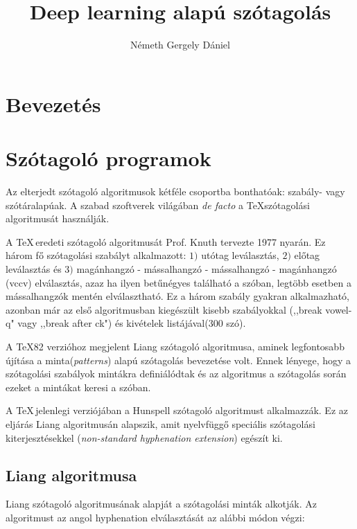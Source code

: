 \documentclass[a4paper, magyar]{article}
\title{Deep learning alapú szótagolás}
\author{N{\'e}meth Gergely D{\'a}niel}
\date{}
\begin{document}
\selectfont
\maketitle



\begin{abstract}

\end{abstract}
\begin{abstract}
	
\end{abstract}

\section{Bevezetés}
\section{Szótagoló programok}
Az elterjedt szótagoló algoritmusok kétféle csoportba bonthatóak: szabály- vagy szótáralapúak. A szabad szoftverek világában \textit{de facto} a \TeX szótagolási algoritmusát használják.

A \TeX\,eredeti szótagoló algoritmusát Prof. Knuth tervezte 1977 nyarán\cite{knuth1979tex}. Ez három fő szótagolási szabályt alkalmazott: $1)$ utótag leválasztás, $2)$ előtag leválasztás és $3)$ magánhangzó - mássalhangzó - mássalhangzó - magánhangzó (vccv) elválasztás, azaz ha ilyen betűnégyes található a szóban, legtöbb esetben a mássalhangzók mentén elválasztható. Ez a három szabály gyakran alkalmazható, azonban már az első algoritmusban kiegészült kisebb szabályokkal (,,break vowel-q" vagy ,,break after ck") és kivételek listájával(300 szó).

A \TeX82 verzióhoz megjelent Liang szótagoló algoritmusa\cite{liang1983word}, aminek legfontosabb újítása a minta(\textit{patterns}) alapú szótagolás bevezetése volt. Ennek lényege, hogy a szótagolási szabályok mintákra definiálódtak és az algoritmus a szótagolás során ezeket a mintákat keresi a szóban.

A \TeX\,jelenlegi verziójában a Hunspell szótagoló algoritmust alkalmazzák\cite{nemeth2006automatic}. Ez az eljárás Liang algoritmusán alapszik, amit nyelvfüggő speciális szótagolási kiterjesztésekkel (\textit{non-standard hyphenation extension}) egészít ki.
\subsection{Liang algoritmusa}
Liang szótagoló algoritmusának alapját a szótagolási minták alkotják\cite{liang1983word}. Az algoritmust az angol 
{\selectfont
	hyphenation%
} elválasztását az alábbi módon végzi:
\end{document}
